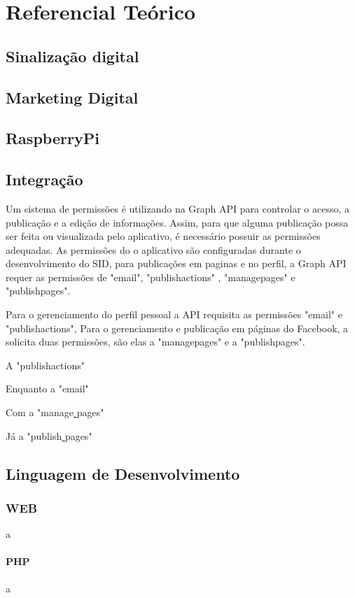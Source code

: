 
\chapter[Referencial Teórico]{Referencial Teórico}
\section{Sinalização digital}
\section{Marketing Digital}
\section{RaspberryPi}
\section{Integração}
Um sistema de permissões é utilizando na Graph API para controlar o acesso, a publicação e a edição de informações. Assim, para que alguma publicação possa ser feita ou visualizada pelo aplicativo, é necessário possuir as permissões adequadas. As permissões do o aplicativo são configuradas durante o desenvolvimento do SID, para publicações em paginas e no perfil, a Graph API requer as permissões de  "email", "publish\textunderscore{}actions" , "manage\textunderscore{}pages"  e "publish\textunderscore{}pages".

Para o gerenciamento do perfil pessoal a API requisita as permissões  "email" e "publish\textunderscore{}actions",  Para o gerenciamento e publicação em páginas  do Facebook, a solicita duas permissões, são elas a "manage\textunderscore{}pages" e a "publish\textunderscore{}pages".

A "publish\textunderscore{}actions"

Enquanto a "email"

Com a "manage\underline{{ }}pages"

Já a "publish\underline{{ }}pages"
\section{Linguagem de Desenvolvimento}
\subsection{WEB}
a

\subsubsection{PHP}
a

